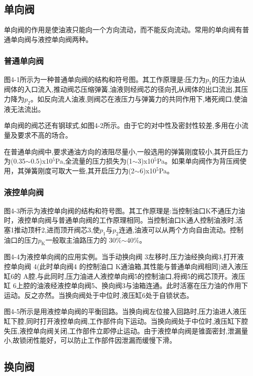 \subsection{单向阀}

单向阀的作用是使油液只能向一个方向流动，而不能反向流动。常用的单向阀有普通单向阀与液控单向阀两种。

\subsubsection{普通单向阀}

图4-1所示为一种普通单向阀的结构和符号图。其工作原理是:压力为$p_\text{1}$的压力油从阀体的入口流入,推动阀芯压缩弹簧,油液则经阀芯的径向孔从阀体的出口流出,其压力降为$p_\text{2}$。如反向流人油液,则阀芯在液压力与弹簧力的共同作用下,堵死阀口,使油液无法流出。

单向阀的阀芯还有钢球式,如图4-2所示。由于它的对中性及密封性较差,多用在小流量及要求不高的场合。

在普通单向阀中,要求通油方向的液阻尽量小,一般选用的弹簧刚度较小,其开启压力为(0.35$\sim$0.5)x10$^5$Pa,全流量的压力损失为(1$\sim$3)x10$^5$Pa。如果单向阀作为背压阀使用，其弹簧刚度可取大一些,其开启压力为(2$\sim$6)x10$^5$Pa。

\subsubsection{液控单向阀}

图4-3所示为液控单向阀的结构和符号图。其工作原理是:当控制油口K不通压力油时，液控单向阀与普通单向阀的工作原理相同。当控制油口K通人控制油液时,活塞1推动顶杆2,进而顶开阀芯3,使$p_\text{1}$与$p_\text{2}$连通,油液可以从两个方向自由流动。控制油口的压力$p_\text{K}$一般取主油路压力的 30\%$\sim$40\%。

图4-4为液控单向阀的应用实例。当手动换向阀 3左移时,压力油经换向阀3,打开液控单向阀 4(此时单向阀4 的控制油口 K通油箱,其性能与普通单向阀相同)进入液压缸6的 A腔,与此同时,压力油进人液控单向阀5的控制油口,将阀5的阀芯顶开。液压缸 6上腔的油液经液控单向阀5、换向阀3与油箱连通。此时活塞在压力油的作用下运动。反之亦然。当换向阀处于中位时,液压缸6处于自锁状态。

图4-5所示是用液控单向阀的平衡回路。当换向阀左位接入回路时,压力油进人液压缸下腔,同时打开液控单向阀,工作部件向下运动。当换向阀处于中位时,液压缸下腔失压,液控单向阀关闭,工作部件立即停止运动。由于液控单向阀是锥面密封,泄漏量小,故锁闭性能好，可以防止工作部件因泄漏而缓慢下滑。

\subsection{换向阀}

